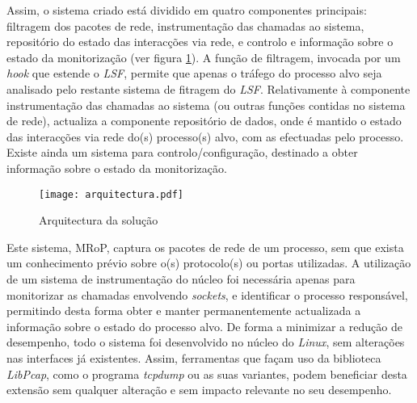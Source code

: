 Assim, o sistema criado está dividido em quatro componentes principais: filtragem dos pacotes de rede, instrumentação das chamadas ao sistema, repositório do estado das interacções via rede, e controlo e informação sobre o estado da monitorização (ver figura \ref{arquitectura}).
A função de filtragem, invocada por um \textit{hook} que estende o \textit{LSF}, permite que apenas o tráfego do processo alvo seja analisado pelo restante sistema de fitragem do \textit{LSF}.
Relativamente à componente instrumentação das chamadas ao sistema (ou outras funções contidas no sistema de rede), actualiza a componente repositório de dados, onde é mantido o estado das interacções via rede do(s) processo(s) alvo, com as efectuadas pelo processo.
Existe ainda um sistema para controlo/configuração, destinado a obter informação sobre o estado da monitorização.

\begin{figure}[htbp]
\begin{center}
\texttt{[image: arquitectura.pdf]} 
\caption{Arquitectura da solução}
\label{arquitectura}
\end{center}
\end{figure}

Este sistema, MRoP, captura os pacotes de rede de um processo, sem que exista um conhecimento prévio sobre o(s) protocolo(s) ou portas utilizadas.
A utilização de um sistema de instrumentação do núcleo foi necessária apenas para monitorizar as chamadas envolvendo \emph{sockets}, e identificar o processo responsável, permitindo desta forma obter e manter permanentemente actualizada a informação sobre o estado do processo alvo.
De forma a minimizar a redução de desempenho, todo o sistema foi desenvolvido no núcleo do \textit{Linux}, sem alterações nas interfaces já existentes.
Assim, ferramentas que façam uso da biblioteca \textit{LibPcap}, como o programa \textit{tcpdump} ou as suas variantes, podem beneficiar desta extensão sem qualquer alteração e sem impacto relevante no seu desempenho.



